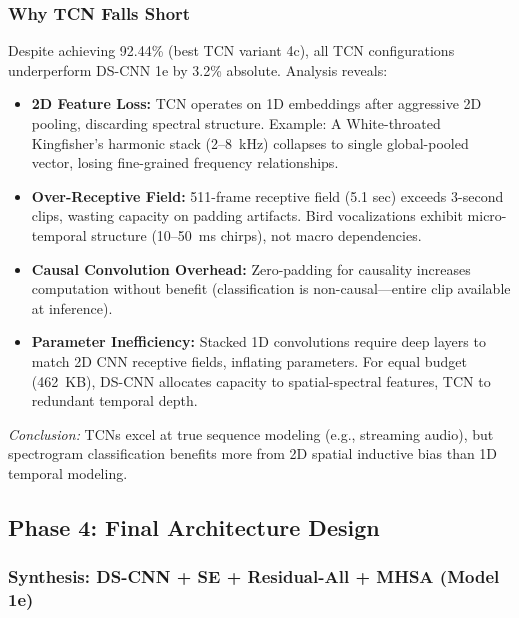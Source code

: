 \documentclass[10pt,a4paper,twoside]{article}
\begin{document}
\subsubsection{Why TCN Falls Short}

Despite achieving 92.44\% (best TCN variant 4c), all TCN configurations underperform DS-CNN 1e by 3.2\% absolute. Analysis reveals:

\begin{itemize}
	\item \textbf{2D Feature Loss:} TCN operates on 1D embeddings after aggressive 2D pooling, discarding spectral structure. Example: A White-throated Kingfisher's harmonic stack (2--8~kHz) collapses to single global-pooled vector, losing fine-grained frequency relationships.

	\item \textbf{Over-Receptive Field:} 511-frame receptive field (5.1 sec) exceeds 3-second clips, wasting capacity on padding artifacts. Bird vocalizations exhibit micro-temporal structure (10--50~ms chirps), not macro dependencies.

	\item \textbf{Causal Convolution Overhead:} Zero-padding for causality increases computation without benefit (classification is non-causal—entire clip available at inference).

	\item \textbf{Parameter Inefficiency:} Stacked 1D convolutions require deep layers to match 2D CNN receptive fields, inflating parameters. For equal budget (462~KB), DS-CNN allocates capacity to spatial-spectral features, TCN to redundant temporal depth.
\end{itemize}

\noindent\textit{Conclusion:} TCNs excel at true sequence modeling (e.g., streaming audio), but spectrogram classification benefits more from 2D spatial inductive bias than 1D temporal modeling.

\subsection{Phase 4: Final Architecture Design}
\label{sec:phase4}

\subsubsection{Synthesis: DS-CNN + SE + Residual-All + MHSA (Model 1e)}
\end{document}
